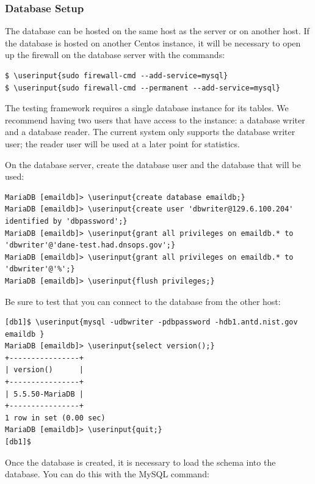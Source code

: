 \documentclass[preprint,3p]{elsarticle}
\newcommand\userinput[1]{\textbf{#1}}
\begin{document}
\subsubsection{Database Setup}

The database can be hosted on the same host as the server or on
another host. If the database is hosted on another Centos instance,
it will be necessary to open up the firewall on the database server
with the commands:

\begin{Verbatim}[commandchars=\\\{\}]
$ \userinput{sudo firewall-cmd --add-service=mysql}
$ \userinput{sudo firewall-cmd --permanent --add-service=mysql}
\end{Verbatim}

The testing framework requires a single database instance for its
tables. We recommend having two users that have access to the
instance: a database writer and a database reader. The current system
only supports the database writer user; the reader user will be used
at a later point for statistics.

On the database server, create the database user and the database that
will be used:

\begin{Verbatim}[commandchars=\\\{\}]
MariaDB [emaildb]> \userinput{create database emaildb;}
MariaDB [emaildb]> \userinput{create user 'dbwriter@129.6.100.204' identified by 'dbpassword';}
MariaDB [emaildb]> \userinput{grant all privileges on emaildb.* to 'dbwriter'@'dane-test.had.dnsops.gov';}
MariaDB [emaildb]> \userinput{grant all privileges on emaildb.* to 'dbwriter'@'%';}
MariaDB [emaildb]> \userinput{flush privileges;}
\end{Verbatim}

Be sure to test that you can connect to the database from the other host:

\begin{Verbatim}[commandchars=\\\{\}]
[db1]$ \userinput{mysql -udbwriter -pdbpassword -hdb1.antd.nist.gov emaildb }
MariaDB [emaildb]> \userinput{select version();}
+----------------+
| version()      |
+----------------+
| 5.5.50-MariaDB |
+----------------+
1 row in set (0.00 sec)
MariaDB [emaildb]> \userinput{quit;}
[db1]$ 
\end{Verbatim}

Once the database is created, it is necessary to load the schema into
the database. You can do this with the MySQL command:
\end{document}
